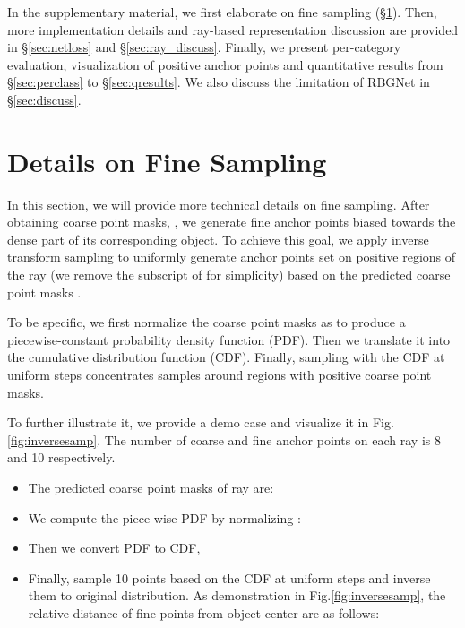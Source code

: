 \documentclass[final]{cvpr}
\begin{document}
\clearpage
\appendix
In the supplementary material, we first elaborate on fine sampling (\S\ref{sec:finesamp}). Then, more implementation details and ray-based representation discussion are provided in \S\ref{sec:netloss} and \S\ref{sec:ray_discuss}. Finally, we present per-category evaluation, visualization of positive anchor points and quantitative results from \S\ref{sec:perclass} to \S\ref{sec:qresults}. We also discuss the limitation of RBGNet in \S\ref{sec:discuss}.


\section{Details on Fine Sampling} \label{sec:finesamp}
In this section, we will provide more technical details on fine sampling. After obtaining coarse point masks, , we generate fine anchor points biased towards the dense part of its corresponding object. To achieve this goal, we apply inverse transform sampling to uniformly generate  anchor points set  on positive regions of the  ray (we remove the subscript  of  for simplicity) based on the predicted coarse point masks .

To be specific, we first normalize the coarse point masks as  to produce a piecewise-constant probability density function (PDF). Then we translate it into the cumulative distribution function (CDF). Finally, sampling with the CDF at uniform steps concentrates samples around regions with positive coarse point masks. 

To further illustrate it, we provide a demo case and visualize it in Fig.\ref{fig:inversesamp}. The number of coarse and fine anchor points on each ray is 8 and 10 respectively.
\begin{itemize}
	\setlength{\itemsep}{0pt}
	\setlength{\parsep}{-2pt}
	\setlength{\parskip}{-0pt}
	\setlength{\leftmargin}{-10pt}
	
	\item The predicted coarse point masks of  ray are:
	
	\item We compute the piece-wise PDF by normalizing :
	
	\item Then we convert PDF to CDF, 
	
	\item Finally, sample 10 points based on the CDF at uniform steps and inverse them to original distribution. As demonstration in Fig.\ref{fig:inversesamp}, the relative distance of fine points from object center are as follows:
	
	
	

\end{itemize}
\end{document}
